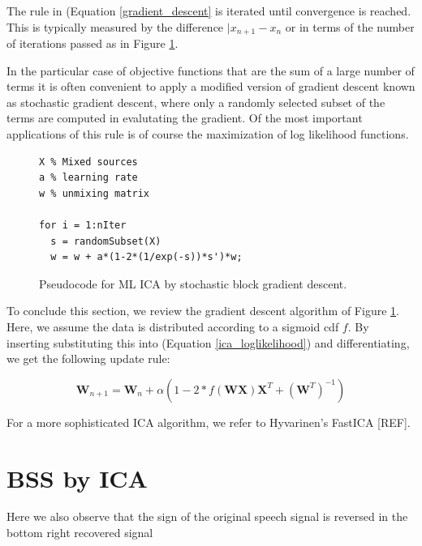 \documentclass[11pt, oneside, a4paper]{report}
\begin{document}
The rule in (Equation \ref{gradient_descent} is iterated until convergence is reached.
This is typically measured by the difference $|x_{n+1}-x_n$ or in terms of the number of
iterations passed as in Figure \ref{mlica_code}.

In the particular case of objective functions that are the sum of a large number
of terms it is often convenient to apply a modified version of gradient descent
known as stochastic gradient descent, where only a randomly selected subset of the 
terms are computed in evalutating the gradient. Of the most important applications of this
rule is of course the maximization of log likelihood functions.

\begin{figure}[!htpb]\label{ica_listing}
  \begin{lstlisting}[frame=single]
% Variables:
X % Mixed sources
a % learning rate
w % unmixing matrix

for i = 1:nIter
  s = randomSubset(X)
  w = w + a*(1-2*(1/exp(-s))*s')*w;  
  \end{lstlisting}
  \caption{Pseudocode for ML ICA by stochastic block gradient descent.}
  \label{mlica_code}
\end{figure}

To conclude this section, we review the gradient descent algorithm of Figure \ref{mlica_code}.
Here, we assume the data is distributed according to a sigmoid cdf $f$. By inserting substituting
this into (Equation \ref{ica_loglikelihood}) and differentiating, we get the following update rule:


\begin{equation}
  \mathbf{W}_{n+1} = \mathbf{W}_{n} + \alpha(1-2*f(\mathbf{W}\mathbf{X})\mathbf{X}^T + (\mathbf{W}^T)^{-1})
\end{equation}

For a more sophisticated ICA algorithm, we refer to Hyvarinen's FastICA [REF].


\section{BSS by ICA}\label{BSS_ICA}

Here we also observe that the sign of the original speech signal is reversed in the 
bottom right recovered signal
\end{document}
